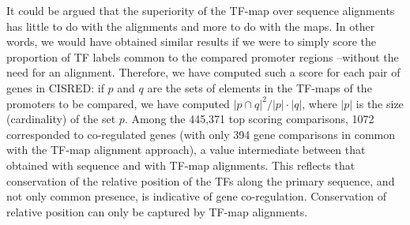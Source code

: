 It could be argued that the superiority of the TF-map over sequence
alignments has little to do with the alignments and more to do with the
maps. In other words, we would have obtained similar results if we
were to simply score the proportion of TF labels common to the
compared promoter regions --without the need for an
alignment. Therefore, we have computed such a score for each pair of
genes in CISRED: if $p$ and $q$ are the sets of elements in the 
TF-maps of the promoters to be compared, we have computed  
${|p \cap q|^2} / {|p| \cdot |q|}$, where $|p|$ is the size
(cardinality) of the set $p$. Among the 445,371 top scoring
comparisons, 1072 corresponded to co-regulated genes
(with only 394 gene comparisons in common with the TF-map alignment approach), 
a value intermediate between that obtained with sequence and with TF-map
alignments. This reflects that conservation of the relative position of
the TFs along the primary sequence, and not only
common presence, is indicative of gene co-regulation. Conservation of
relative position can only be captured by TF-map alignments.

